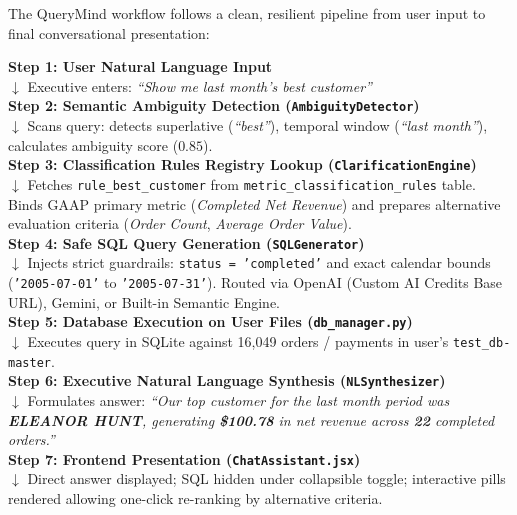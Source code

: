 \documentclass[10pt,a4paper]{article}
\begin{document}
The QueryMind workflow follows a clean, resilient pipeline from user input to final conversational presentation:

\begin{center}
\begin{tcolorbox}[colback=white,colframe=brandnavy,width=0.98\textwidth,arc=2mm]
\small
\textbf{Step 1: User Natural Language Input} \\
$\downarrow$ Executive enters: \textit{``Show me last month's best customer''} \\
\textbf{Step 2: Semantic Ambiguity Detection (\texttt{AmbiguityDetector})} \\
$\downarrow$ Scans query: detects superlative (\textit{``best''}), temporal window (\textit{``last month''}), calculates ambiguity score ($0.85$). \\
\textbf{Step 3: Classification Rules Registry Lookup (\texttt{ClarificationEngine})} \\
$\downarrow$ Fetches \texttt{rule\_best\_customer} from \texttt{metric\_classification\_rules} table. Binds GAAP primary metric (\textit{Completed Net Revenue}) and prepares alternative evaluation criteria (\textit{Order Count}, \textit{Average Order Value}). \\
\textbf{Step 4: Safe SQL Query Generation (\texttt{SQLGenerator})} \\
$\downarrow$ Injects strict guardrails: \texttt{status = 'completed'} and exact calendar bounds (\texttt{'2005-07-01'} to \texttt{'2005-07-31'}). Routed via OpenAI (Custom AI Credits Base URL), Gemini, or Built-in Semantic Engine. \\
\textbf{Step 5: Database Execution on User Files (\texttt{db\_manager.py})} \\
$\downarrow$ Executes query in SQLite against 16,049 orders / payments in user's \texttt{test\_db-master}. \\
\textbf{Step 6: Executive Natural Language Synthesis (\texttt{NLSynthesizer})} \\
$\downarrow$ Formulates answer: \textit{``Our top customer for the last month period was \textbf{ELEANOR HUNT}, generating \textbf{\$100.78} in net revenue across \textbf{22} completed orders.''} \\
\textbf{Step 7: Frontend Presentation (\texttt{ChatAssistant.jsx})} \\
$\downarrow$ Direct answer displayed; SQL hidden under collapsible toggle; interactive pills rendered allowing one-click re-ranking by alternative criteria.
\end{tcolorbox}
\end{center}
\end{document}
